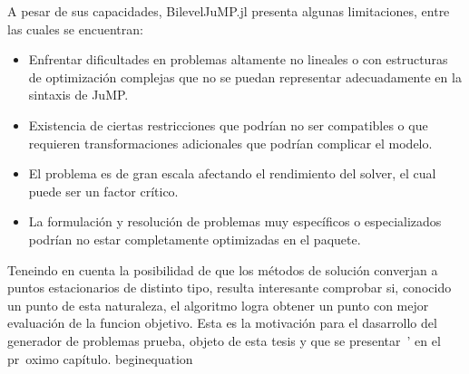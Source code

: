 
A pesar de sus capacidades, BilevelJuMP.jl presenta algunas limitaciones, entre las cuales se encuentran:

\begin{itemize}
    \item Enfrentar dificultades en problemas altamente no lineales o con estructuras de optimización complejas que no se puedan representar adecuadamente en la sintaxis de JuMP.
    \item Existencia de ciertas restricciones que podrían no ser compatibles o que requieren transformaciones adicionales que podrían complicar el modelo.
    \item El problema es de gran escala afectando el rendimiento del solver, el cual puede ser un factor crítico.
    \item La formulación y resolución de problemas muy específicos o especializados podrían no estar completamente optimizadas en el paquete.
\end{itemize}

Teneindo en cuenta la posibilidad de que los m\'etodos de soluci\'on converjan a puntos estacionarios de distinto tipo, resulta interesante comprobar si, conocido un punto de esta naturaleza, el algoritmo logra obtener un punto con  mejor evaluaci\'on de la funcion objetivo. Esta es la motivaci\'on para el dasarrollo del generador de problemas prueba, objeto de esta tesis y que se presentar\ ' en el pr\ oximo cap\'itulo.
begin{equation}
%
